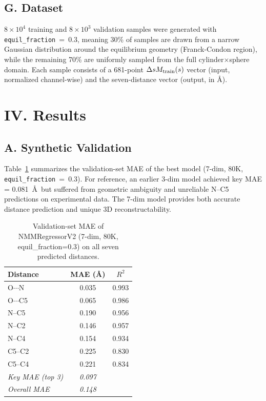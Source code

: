 \documentclass[12pt]{article}
\newcommand{\dsm}{\Delta sM}
\begin{document}
\subsection*{G.\; Dataset}

$8\times10^4$ training and $8\times10^3$ validation samples were
generated with \texttt{equil\_fraction}~=~0.3, meaning 30\% of
samples are drawn from a narrow Gaussian distribution around the
equilibrium geometry (Franck-Condon region), while the remaining 70\%
are uniformly sampled from the full cylinder$\times$sphere domain.
Each sample consists of a 681-point $\dsm_{\rm train}(s)$ vector
(input, normalized channel-wise) and the seven-distance vector
(output, in \AA).

\section*{IV.\; Results}

\subsection*{A.\; Synthetic Validation}

Table~\ref{tab:val} summarizes the validation-set MAE of the
best model (7-dim, 80K, \texttt{equil\_fraction}~=~0.3).
For reference, an earlier 3-dim model achieved key MAE =
0.081~\AA\ but suffered from geometric ambiguity and unreliable
N--C5 predictions on experimental data. The 7-dim model provides
both accurate distance prediction and unique 3D reconstructability.

\begin{table}[htb]
  \caption{Validation-set MAE of NMMRegressorV2 (7-dim, 80K,
    equil\_fraction=0.3) on all seven predicted distances.}
  \label{tab:val}
  \centering
  \begin{tabular}{lcc}
    \toprule
    Distance & MAE (\AA) & $R^2$ \\
    \midrule
    O$\cdots$N   & 0.035 & 0.993 \\
    O$\cdots$C5  & 0.065 & 0.986 \\
    N--C5        & 0.190 & 0.956 \\
    N--C2        & 0.146 & 0.957 \\
    N--C4        & 0.154 & 0.934 \\
    C5--C2       & 0.225 & 0.830 \\
    C5--C4       & 0.221 & 0.834 \\
    \midrule
    \textit{Key MAE (top 3)} & \textit{0.097} & \\
    \textit{Overall MAE}     & \textit{0.148} & \\
    \bottomrule
  \end{tabular}
\end{table}
\end{document}
